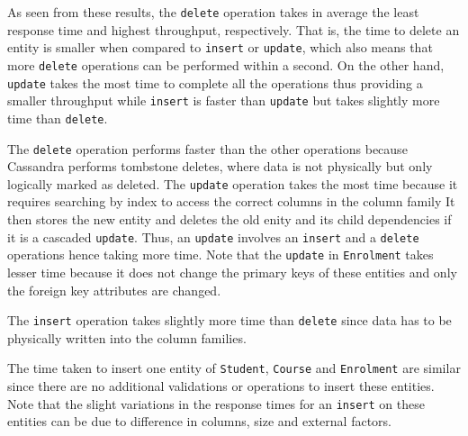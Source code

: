 As seen from these results, the \texttt{delete} operation takes in average the
least response time and  highest throughput, respectively. That is, the time to
delete an entity is smaller when compared to \texttt{insert} or \texttt{update},
which also means that more \texttt{delete} operations can be performed within a
second. On the other hand, \texttt{update} takes the most time to complete all
the operations thus providing a smaller throughput while \texttt{insert} is
faster than \texttt{update} but takes slightly more time than \texttt{delete}.

The \texttt{delete} operation performs faster than the other operations because
Cassandra performs  tombstone deletes, where data is not physically but only
logically marked as deleted. The \texttt{update} operation takes the most time
because it requires searching by index to access the correct columns in the
column family It then stores the new entity and deletes  the old enity and its
child dependencies if it is a cascaded \texttt{update}. Thus,  an
\texttt{update} involves an \texttt{insert} and a \texttt{delete} operations
hence taking more time. Note that the \texttt{update} in \texttt{Enrolment}
takes lesser time because it does not change the primary keys of these entities
and only the foreign key attributes are changed. %

The \texttt{insert} operation takes slightly more time than \texttt{delete}
since data has to be physically written into the column families.

The time taken to insert one entity of \texttt{Student}, \texttt{Course} and
\texttt{Enrolment} are similar since there are no additional validations or
operations to insert these entities. Note that the slight variations in the
response times for an \texttt{insert} on these entities can be due to
difference in columns, size and external factors.



